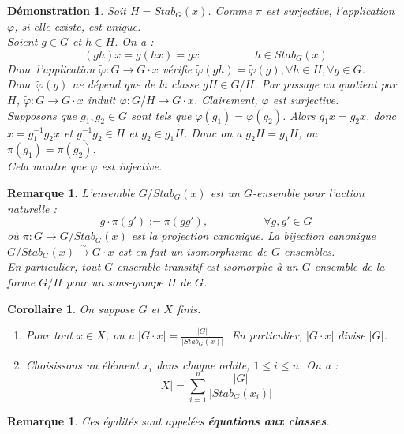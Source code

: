\documentclass[a4paper, oneside]{report}
\theoremstyle{break}
\newtheorem{cor}[thm]{Corollaire}
\newtheorem{remar}[thm]{Remarque}
\newtheorem*{demo}{Démonstration}
\newcommand{\fong}{\overset{\sim}{\rightarrow}}
\begin{document}
\begin{demo}
	Soit $H=Stab_G(x)$. Comme $\pi$ est surjective, l'application $\varphi$, si elle existe, est unique.\\
	Soient $g\in G$ et $h\in H$. On a :
	$$(gh)x = g(hx)=gx\hspace{5em}h\in Stab_G(x)$$
	Donc l'application $\tilde{\varphi}: G\rightarrow G \cdot x$ vérifie $\tilde{\varphi}(gh)=\tilde{\varphi}(g), \forall h\in H, \forall g\in G$.\\
	Donc $\tilde{\varphi}(g)$ ne dépend que de la classe $gH\in G/H$. Par passage au quotient par $H$, $\tilde{\varphi}:G \rightarrow G \cdot x$ induit $\varphi :G/H \rightarrow G \cdot x$. Clairement, $\varphi$ est surjective.\\
	Supposons que $g_1, g_2\in G$ sont tels que $\varphi(g_1)=\varphi(g_2)$. Alors $g_1x=g_2x$, donc $x=g_1^{-1}g_2x$ et $g_1^{-1}g_2\in H$ et $g_2\in g_1H$. Donc on a $g_2H=g_1H$, ou $\pi(g_1)=\pi(g_2)$.\\
	Cela montre que $\varphi$ est injective.
\end{demo}

\begin{remar}
	L'ensemble $G/Stab_G(x)$ est un $G$-ensemble pour l'action naturelle :
	$$ g \cdot \pi(g') := \pi(gg'),\hspace{5em}\forall g,g'\in G$$
	où $\pi : G\rightarrow G/Stab_G(x)$ est la projection canonique. La bijection canonique $G/Stab_G(x)\fong G \cdot x$ est en fait un isomorphisme de $G$-ensembles.\\
	En particulier, tout $G$-ensemble transitif est isomorphe à un $G$-ensemble de la forme $G/H$ pour un sous-groupe $H$ de $G$.
\end{remar}

\begin{cor}
	On suppose $G$ et $X$ finis.
	\begin{enumerate}
		\item Pour tout $x\in X$, on a $|G \cdot x|=\frac{|G|}{|Stab_G(x)|}$. En particulier, $|G \cdot x|$ divise $|G|$.
		\item Choisissons un élément $x_i$ dans chaque orbite, $1\leq i \leq n$. On a :
		$$|X|=\sum_{i=1}^{n}\frac{|G|}{|Stab_G(x_i)|}$$
	\end{enumerate}
\end{cor}

\begin{remar}
	Ces égalités sont appelées \textbf{équations aux classes}.
\end{remar}
\end{document}
